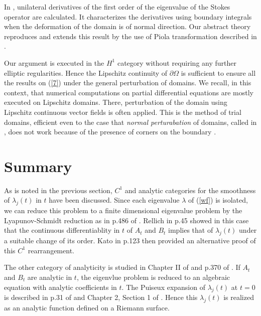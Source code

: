 \documentclass[final,a4paper]{jmsj}
\theoremstyle{thmstyleone}%
\theoremstyle{thmstyletwo}%
\theoremstyle{thmstylethree}%
\begin{document}
 
In \cite{ju15}, unilateral derivatives of the first order of the eigenvalue of the Stokes operator are calculated. It  characterizes the derivatives using boundary integrals when the deformation of the domain is of normal direction. Our abstract theory reproduces and extends this result by the use of Piola transformation described in \cite{mh94}. 

Our argument is executed in the $H^1$ category without requiring any further elliptic regularities. Hence the Lipschitz continuity of $\partial\Omega$ is sufficient to ensure all the results on (\ref{7}) under the general perturbation of domains. We recall, in this context, that numerical computations on partial differential equations  are mostly executed on Lipschitz domains. There, perturbation of the domain using Lipschitz continuous vector fields is often applied. This is the method of trial domains, efficient even to the case that {\it normal perturabation} of domains, called in \cite{st05}, does not work because of the presence of corners on the boundary \cite{st05, st11}. 

\section{Summary}\label{summary0}

As is noted in the previous section, $C^1$ and analytic categories for the smoothness of $\lambda_j(t)$ in $t$ have been discussed. Since each  eigenvalue $\lambda$ of (\ref{wf}) is isolated, we can reduce this problem to a finite dimensional eigenvalue problem by the Lyapunov-Schmidt reduction as in p.486 of \cite{ch82}.  Rellich \cite{rellich53} in p.45 showed in this case that the continuous differentiablity in $t$ of $A_t$ and $B_t$ implies that of $\lambda_j(t)$ under a suitable change of its order. Kato \cite{kato76} in p.123 then provided an alternative proof of this $C^1$ rearrangement. 

The other category of analyticity is studied in Chapter II of \cite{rellich53} and p.370 of \cite{kato76}.  If $A_t$ and $B_t$ are analytic in $t$, the eigenvlue problem is reduced to an algebraic equation with analytic coefficients in $t$. The Puiseux expansion of $\lambda_j(t)$ at $t=0$ is described in p.31 of \cite{rellich53} and Chapter 2, Section 1 of \cite{kato76}. Hence this $\lambda_j(t)$ is realized as an analytic function defined on a Riemann surface. 
\end{document}
